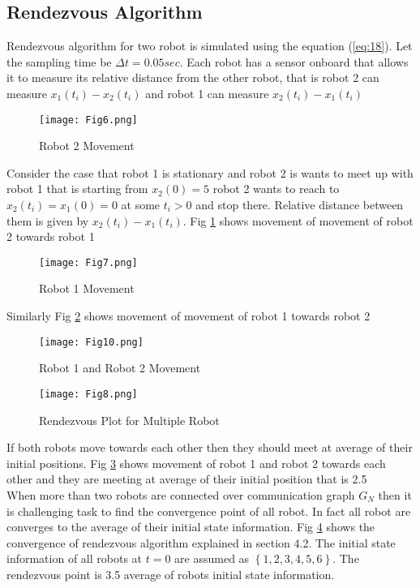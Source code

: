 \documentclass[twocolumn]{IETEJR}
\begin{document}
\subsection{Rendezvous Algorithm}
Rendezvous algorithm for two robot is simulated using the equation (\ref{eq:18}). Let the sampling time be $\Delta t =0.05 sec$. Each robot has a sensor onboard that allows it to measure its relative distance from the other robot, that is robot 2 can measure $x_{1}(t_{i})-x_{2}(t_{i}) $ and robot 1 can measure $x_{2}(t_{i})-x_{1}(t_{i}) $
\begin{figure}[h]
	\texttt{[image: Fig6.png]}
	\caption{Robot 2 Movement }
	\label{plot2}
\end{figure}
Consider the case that robot 1 is stationary and robot 2 is wants to meet up with robot 1 that is starting from $x_{2}(0)=5$ robot 2 wants to reach to $x_{2}(t_{i})=x_{1}(0)=0$ at some $t_{i}>0$ and stop there. Relative distance between them is given by $x_{2}(t_{i})-x_{1}(t_{i})$. Fig \ref{plot2} shows movement of movement of robot 2 towards robot 1
\begin{figure}[h]
	\texttt{[image: Fig7.png]}
	\caption{Robot 1 Movement}
	\label{plot3}
\end{figure}
Similarly Fig \ref{plot3} shows movement of movement of robot 1 towards robot 2
\begin{figure}[h]
	\texttt{[image: Fig10.png]}
	\caption{Robot 1 and Robot 2 Movement}
	\label{plot10}
\end{figure}

\begin{figure}[h]
	\texttt{[image: Fig8.png]}
	\caption{Rendezvous Plot for Multiple Robot}
	\label{plot4}
\end{figure}
If both robots move towards each other then they should meet at average of their initial positions. Fig \ref{plot10} shows movement of robot 1 and robot 2 towards each other and they are meeting at average of their initial position that is 2.5\\

When more than two robots are connected over communication graph $G_{N}$ then it is challenging task to find the convergence point of all robot. In fact all robot are converges to the average of their initial state information. Fig \ref{plot4} shows the convergence of rendezvous algorithm explained in section 4.2. The initial state information of all robots at $t=0$ are assumed as $\left\lbrace 1,2,3,4,5,6\right\rbrace$. The rendezvous point is 3.5 average of robots initial state information.    
\end{document}
